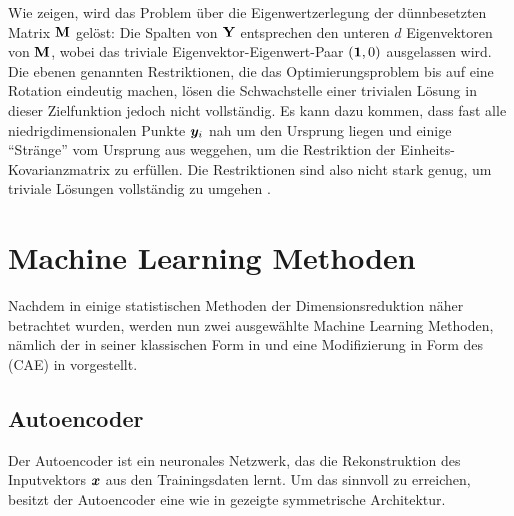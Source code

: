 Wie \textcite[3 -- 4]{Ghojogh.2020} zeigen, wird das Problem über die Eigenwertzerlegung der
dünnbesetzten Matrix $\mathbf{M}$ gelöst: Die Spalten von $\mathbf{Y}$ entsprechen den unteren $d$
Eigenvektoren von $\mathbf{M}$, wobei das triviale Eigenvektor-Eigenwert-Paar $(\bm{1}, 0)$ ausgelassen
wird. Die ebenen genannten Restriktionen, die das Optimierungsproblem bis auf eine Rotation
eindeutig machen, lösen die Schwachstelle einer trivialen Lösung in dieser Zielfunktion jedoch
nicht vollständig. Es kann dazu kommen, dass fast alle niedrigdimensionalen Punkte $\bm{y}_i$ nah
um den Ursprung liegen und einige \enquote{Stränge} vom Ursprung aus weggehen, um die Restriktion
der Einheits-Kovarianzmatrix zu erfüllen. Die Restriktionen sind also nicht stark genug, um
triviale Lösungen vollständig zu umgehen \parencite[vgl.][23]{vanderMaaten.2009}.

\section{Machine Learning Methoden}
\label{ch:MethodenDerDimRed:modern}
Nachdem in  einige statistischen Methoden der
Dimensionsreduktion näher betrachtet wurden, werden nun zwei ausgewählte Machine Learning Methoden,
nämlich der  in seiner klassischen Form in
 und eine Modifizierung in Form des  (CAE) in  vorgestellt.

\subsection{Autoencoder}
\label{ch:MethodenDerDimRed:ML:AE}

Der Autoencoder ist ein neuronales Netzwerk, das die Rekonstruktion des Inputvektors $\bm{x}$ aus
den Trainingsdaten lernt. Um das sinnvoll zu erreichen, besitzt der Autoencoder eine wie in
 gezeigte symmetrische Architektur.



